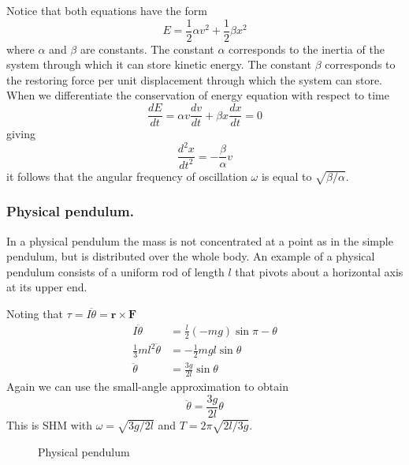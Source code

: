 \documentclass[../../../main.tex]{subfiles}
\begin{document}
Notice that both equations have the form
\begin{equation*}
    E=\frac{1}{2}\alpha v^2+\frac{1}{2}\beta x^2
\end{equation*}
where $\alpha$ and $\beta$ are constants. The constant $\alpha$ corresponds to the inertia of the system through which it can store kinetic energy. The constant $\beta$ corresponds to the restoring force per unit displacement through which the system can store. When we differentiate the conservation of energy equation with respect to time 
\begin{equation*}
    \frac{dE}{dt}=\alpha v\frac{dv}{dt}+\beta x\frac{dx}{dt}=0
\end{equation*}
giving
\begin{equation*}
    \frac{d^2x}{dt^2}=-\frac{\beta}{\alpha}v
\end{equation*}
it follows that the angular frequency of oscillation $\omega$ is equal to $\sqrt{\beta/\alpha}$.

\subsubsection{Physical pendulum.} In a physical pendulum the mass is not concentrated at a point as in the simple pendulum, but is distributed over the whole body. An example of a physical pendulum consists of a uniform rod of length $l$ that pivots about a horizontal axis at its upper end. 

Noting that $\tau=I\ddot{\theta}=\mathbf{r}\times\mathbf{F}$
\begin{align*}
    I\ddot{\theta}&=\frac{l}{2}(-mg)\sin \pi-\theta\\
    \frac{1}{3}ml^2\ddot{\theta}&=-\frac{1}{2}mgl\sin \theta\\
    \ddot{\theta}&=\frac{3g}{2l}\sin\theta
\end{align*}
Again we can use the small-angle approximation to obtain
\begin{equation*}
    \ddot{\theta}=\frac{3g}{2l}\theta
\end{equation*}
This is SHM with $\omega = \sqrt{3g/2l} $ and $T = 2\pi \sqrt{2l/3g}$.
\begin{figure*}[h]
    \centering
    \caption*{Physical pendulum}
\end{figure*}
\end{document}
